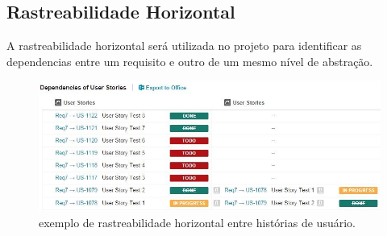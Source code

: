 	\subsection{Rastreabilidade Horizontal}
	A rastreabilidade horizontal será utilizada no projeto para identificar as dependencias entre um requisito e outro de um mesmo nível de abstração.

	\begin{figure}[!htb]
		\centering
		\vspace*{1cm}
		\includegraphics[width = \textwidth]{imagens/rastreabilidade_horizontal.jpg}
		\caption{exemplo de rastreabilidade horizontal entre histórias de usuário.}
		\label{imagem}
	\end{figure}
